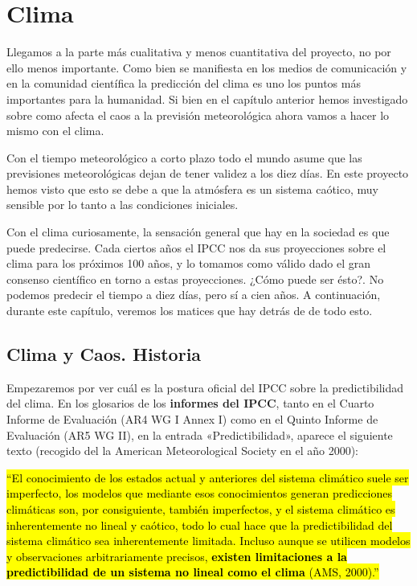 \documentclass[
  10pt,
  a4paper,
  DIV=11,
  numbers=noendperiod,
  open=any]{scrreprt}
\numberwithin{equation}{chapter}
\numberwithin{equation}{chapter}
\renewcommand{\[}{\begin{equation}}
\renewcommand{\]}{\end{equation}}
\begin{document}

\chapter{Clima}\label{clima}

Llegamos a la parte más cualitativa y menos cuantitativa del proyecto,
no por ello menos importante. Como bien se manifiesta en los medios de
comunicación y en la comunidad científica la predicción del clima es uno
los puntos más importantes para la humanidad. Si bien en el capítulo
anterior hemos investigado sobre como afecta el caos a la previsión
meteorológica ahora vamos a hacer lo mismo con el clima.

Con el tiempo meteorológico a corto plazo todo el mundo asume que las
previsiones meteorológicas dejan de tener validez a los diez días. En
este proyecto hemos visto que esto se debe a que la atmósfera es un
sistema caótico, muy sensible por lo tanto a las condiciones iniciales.

Con el clima curiosamente, la sensación general que hay en la sociedad
es que puede predecirse. Cada ciertos años el IPCC nos da sus
proyecciones sobre el clima para los próximos 100 años, y lo tomamos
como válido dado el gran consenso científico en torno a estas
proyecciones. ¿Cómo puede ser ésto?. No podemos predecir el tiempo a
diez días, pero sí a cien años. A continuación, durante este capítulo,
veremos los matices que hay detrás de de todo esto.

\section{Clima y Caos. Historia}\label{clima-y-caos.-historia}

Empezaremos por ver cuál es la postura oficial del IPCC sobre la
predictibilidad del clima. En los glosarios de los \textbf{informes del
IPCC}, tanto en el Cuarto Informe de Evaluación (AR4 WG I Annex I) como
en el Quinto Informe de Evaluación (AR5 WG II), en la entrada
«Predictibilidad», aparece el siguiente texto (recogido del la American
Meteorological Society en el año 2000):

\hl{``El conocimiento de los estados actual y anteriores del sistema
climático suele ser imperfecto, los modelos que mediante esos
conocimientos generan predicciones climáticas son, por consiguiente,
también imperfectos, y el sistema climático es inherentemente no lineal
y caótico, todo lo cual hace que la predictibilidad del sistema
climático sea inherentemente limitada. Incluso aunque se utilicen
modelos y observaciones arbitrariamente precisos, \textbf{existen
limitaciones a la predictibilidad de un sistema no lineal como el clima}
(AMS, 2000).''}
\end{document}
